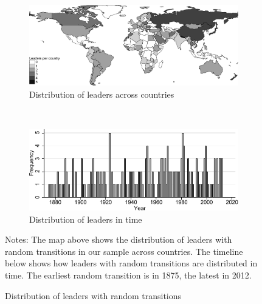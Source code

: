 \begin{figure}[h]
    \centering
    \begin{subfigure}[b]{\textwidth}
        \includegraphics[width=\textwidth]{Figures/World_vsimple.pdf}
        \caption{Distribution of leaders across countries}
        \label{fig:world_map}
    \end{subfigure}
    \\ %
    \begin{subfigure}[b]{0.8\textwidth}
        \includegraphics[width=\textwidth]{Figures/Year_distribution.pdf}
        \caption{Distribution of leaders in time}
        \label{fig:timeline}
    \end{subfigure}
    \caption{Distribution of leaders with random transitions}
    \medskip %
    \begin{minipage}{\textwidth} %
    	{\footnotesize  Notes:  The map above shows the distribution of leaders with random transitions in our sample across countries. The timeline below shows how leaders with random transitions are distributed in time. The earliest random transition is in 1875, the latest in 2012.  \par}
    \end{minipage}
\end{figure}
